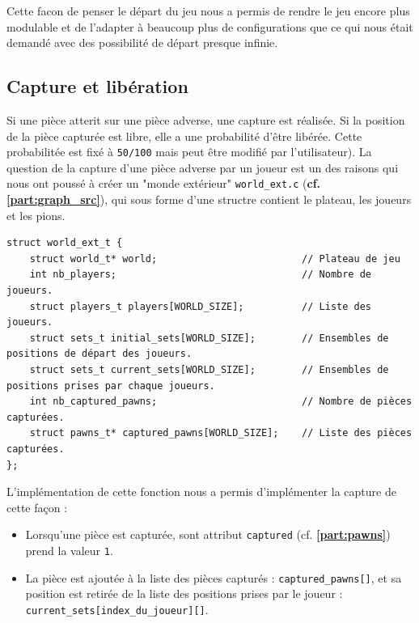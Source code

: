         Cette facon de penser le départ du jeu nous a permis de rendre le jeu encore plus modulable et de l'adapter à beaucoup plus de configurations que ce qui nous était demandé avec des possibilité de départ presque infinie.
            
    \subsection{Capture et libération}
        Si une pièce atterit sur une pièce adverse, une capture est réalisée. Si la position de la pièce capturée est libre, elle a une probabilité d'être libérée. Cette probabilitée est fixé à \texttt{50/100} mais peut être modifié par l'utilisateur).
        La question de la capture d'une pièce adverse par un joueur est un des raisons qui nous ont poussé à créer un "monde extérieur" \texttt{world\_ext.c} (\textbf{cf. \ref{part:graph_src}}), qui sous forme d'une structre contient le plateau, les joueurs et les pions. \\

        \begin{Code}
            \begin{lstlisting}
struct world_ext_t {
	struct world_t* world;                         // Plateau de jeu
	int nb_players;                                // Nombre de joueurs.
	struct players_t players[WORLD_SIZE];          // Liste des joueurs.
	struct sets_t initial_sets[WORLD_SIZE];        // Ensembles de positions de départ des joueurs.
	struct sets_t current_sets[WORLD_SIZE];        // Ensembles de positions prises par chaque joueurs.
	int nb_captured_pawns;                         // Nombre de pièces capturées.
	struct pawns_t* captured_pawns[WORLD_SIZE];    // Liste des pièces capturées.
};\end{lstlisting} \end{Code}
        \noindent L'implémentation de cette fonction nous a permis d'implémenter la capture de cette façon : \\
        \begin{itemize}
            \item Lorsqu'une pièce est capturée, sont attribut \texttt{captured} (cf. \textbf{\ref{part:pawns}}) prend la valeur \texttt{1}.
            \item La pièce est ajoutée à la liste des pièces capturés : \texttt{captured\_pawns[]}, et sa position est retirée de la liste des positions prises par le joueur : \texttt{current\_sets[index\_du\_joueur][]}.
        \end{itemize} 

